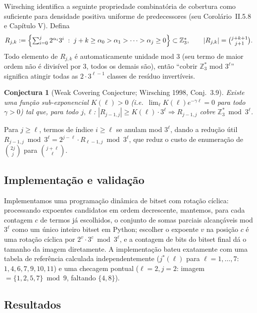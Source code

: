 \documentclass[11pt]{article}
\newtheorem{conjecture}[theorem]{Conjectura}
\theoremstyle{definition}
\theoremstyle{remark}
\begin{document}
Wirsching \cite{Wirsching1998} identifica a seguinte propriedade
combinatória de cobertura como suficiente para densidade positiva
uniforme de predecessores (seu Corolário~II.5.8 e Capítulo V). Defina
\[
  R_{j,k} := \Bigl\{ \textstyle\sum_{i=0}^j 2^{\alpha_i} 3^i \;:\;
  j+k\ge \alpha_0>\alpha_1>\cdots>\alpha_j\ge 0 \Bigr\} \subset
  \mathbb{Z}_3^\ast, \qquad |R_{j,k}| = \binom{j+k+1}{j+1}.
\]
Todo elemento de $R_{j,k}$ é automaticamente unidade mod $3$ (seu
termo de maior ordem não é divisível por $3$, todos os demais são),
então ``cobrir $\mathbb{Z}_3^\ast$ mod $3^\ell$'' significa atingir
todas as $2\cdot 3^{\ell-1}$ classes de resíduo invertíveis.

\begin{conjecture}[Weak Covering Conjecture; Wirsching 1998,
Conj.~3.9]\label{conj:wcc}
Existe uma função sub-exponencial $K(\ell)>0$ (i.e.\
$\lim_\ell K(\ell)e^{-\gamma\ell}=0$ para todo $\gamma>0$) tal que,
para todo $j,\ell$: $|R_{j-1,j}|\ge K(\ell)\cdot 3^\ell \Rightarrow
R_{j-1,j}$ cobre $\mathbb{Z}_3^\ast \bmod 3^\ell$.
\end{conjecture}

Para $j\ge \ell$, termos de índice $i\ge\ell$ se anulam mod $3^\ell$,
dando a redução útil $R_{j-1,j}\bmod 3^\ell = 2^{j-\ell}\cdot
R_{\ell-1,j}\bmod 3^\ell$, que reduz o custo de enumeração de
$\binom{2j}{j}$ para $\binom{j+\ell}{\ell}$.

\subsection{Implementação e validação}

Implementamos uma programação dinâmica de bitset com rotação cíclica:
processando expoentes candidatos em ordem decrescente, mantemos, para
cada contagem $c$ de termos já escolhidos, o conjunto de somas parciais
alcançáveis mod $3^\ell$ como um único inteiro bitset em Python;
escolher o expoente $v$ na posição $c$ é uma rotação cíclica por
$2^v\cdot 3^c\bmod 3^\ell$, e a contagem de bits do bitset final dá o
tamanho da imagem diretamente. A implementação bateu exatamente com uma
tabela de referência calculada independentemente ($j^\ast(\ell)$ para
$\ell=1,\dots,7$: $1,4,6,7,9,10,11$) e uma checagem pontual
($\ell=2,j=2$: imagem $=\{1,2,5,7\}\bmod 9$, faltando $\{4,8\}$).

\subsection{Resultados}
\end{document}
